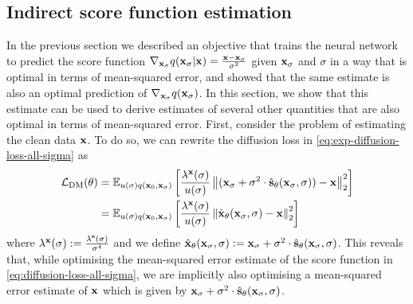 \subsection{Indirect score function estimation} \label{eq:diffusion-equivalent-parameterisations}
In the previous section we described an objective that trains the neural network to predict the score function $\nabla_{{\mathbf{x}}_\sigma} q({\mathbf{x}}_\sigma|{\mathbf{x}}) = \frac{{\mathbf{x}}-{\mathbf{x}}_\sigma}{\sigma^2}$ given ${\mathbf{x}}_\sigma$ and $\sigma$ in a way that is optimal in terms of mean-squared error, and showed that the same estimate is also an optimal prediction of $\nabla_{{\mathbf{x}}_\sigma} q({\mathbf{x}}_\sigma)$. In this section, we show that this estimate can be used to derive estimates of several other quantities that are also optimal in terms of mean-squared error. First, consider the problem of estimating the clean data ${\mathbf{x}}$. To do so, we can rewrite the diffusion loss in \cref{eq:exp-diffusion-loss-all-sigma} as
\begin{align} \label{eq:x0-diffusion-loss}
    {\mathcal{L}}_\text{DM}(\theta) &= \mathbb{E}_{u(\sigma)q({\mathbf{x}}_0, {\mathbf{x}}_\sigma)} \left[ \frac{\lambda^{\mathbf{x}}(\sigma)}{u(\sigma)}
    \left\| ({\mathbf{x}}_\sigma + \sigma^2 \cdot \hat{{\mathbf{s}}}_\theta({\mathbf{x}}_\sigma, \sigma)) - {\mathbf{x}} \right\|_2^2 \right] \\
    &= \mathbb{E}_{u(\sigma)q({\mathbf{x}}_0, {\mathbf{x}}_\sigma)} \left[ 
    \frac{\lambda^{\mathbf{x}}(\sigma)}{u(\sigma)}
    \left\| \hat{{\mathbf{x}}}_\theta({\mathbf{x}}_\sigma, \sigma) - {\mathbf{x}} \right\|_2^2 \right]
\end{align}
where $\lambda^{\mathbf{x}}(\sigma) := \frac{\lambda^{\mathbf{s}}(\sigma)}{\sigma^4}$ and we define $\hat{{\mathbf{x}}}_\theta({\mathbf{x}}_\sigma, \sigma) := {\mathbf{x}}_\sigma + \sigma^2 \cdot \hat{{\mathbf{s}}}_\theta({\mathbf{x}}_\sigma, \sigma)$. This reveals that, while optimising the mean-squared error estimate of the score function in \cref{eq:diffusion-loss-all-sigma}, we are implicitly also optimising a mean-squared error estimate of ${\mathbf{x}}$ which is given by ${\mathbf{x}}_\sigma + \sigma^2 \cdot \hat{{\mathbf{s}}}_\theta({\mathbf{x}}_\sigma, \sigma)$.

